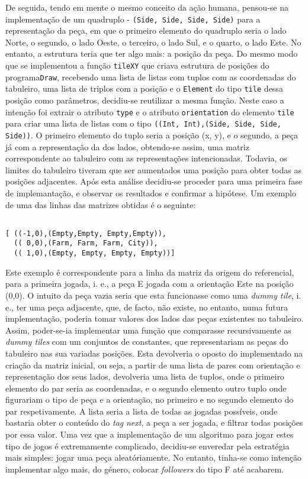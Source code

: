 De seguida, tendo em mente o mesmo conceito da ação humana, pensou-se na implementação de um quadruplo -
\texttt{(Side, Side, Side, Side)} para a representação da peça, em que o primeiro elemento do quadruplo
seria o lado Norte, o segundo, o lado Oeste, o terceiro, o lado Sul, e o quarto, o lado Este. No entanto, a
estrutura teria que ter algo mais: a posição da peça. Do mesmo modo que se implementou a função
\texttt{tileXY} que criava estrutura de posições do programa\texttt{Draw}, recebendo uma lista de listas com
tuplos com as coordenadas do tabuleiro, uma lista de triplos com a posição e o \texttt{Element} do tipo
\texttt{tile} dessa posição como parâmetros, decidiu-se reutilizar a mesma função. Neste caso a
intenção foi extrair o atributo \texttt{type} e o atributo \texttt{orientation} do elemento \texttt{tile}
para criar uma lista de listas com o tipo \texttt{((Int, Int),(Side, Side, Side, Side))}. O primeiro elemento
do tuplo seria a posição (x, y), e o segundo, a peça já com a representação da dos lados, obtendo-se
assim, uma matriz correspondente ao tabuleiro com as representações intencionadas. Todavia, os limites do
tabuleiro tiveram que ser aumentados uma posição para obter todas as posições adjacentes. Após esta
análise decidiu-se proceder para uma primeira fase de implemantação, e observar os resultados e confirmar a
hipótese. Um exemplo de uma das linhas das matrizes obtidas é o seguinte: 
\begin{verbatim} 

[ ((-1,0),(Empty,Empty, Empty,Empty)),
  (( 0,0),(Farm, Farm, Farm, City)), 
  (( 1,0),(Empty, Empty, Empty, Empty))] 

\end{verbatim}

Este exemplo é correspondente para a linha da matriz da origem do referencial, para a primeira jogada, i. e.,
a peça E jogada com a orientação Este na posição (0,0). O intuito da peça vazia seria que esta
funcionasse como uma \emph{dummy tile}, i. e., ter uma peça adjacente, que, de facto, não existe, no
entanto, numa futura implementação, poderia tomar valores dos lados das peças existentes no tabuleiro.
Assim, poder-se-ia implementar uma função que comparasse recursivamente as \emph{dummy tiles} com um
conjuntos de constantes, que representariam as peças do tabuleiro nas sua variadas posições. Esta
devolveria o oposto do implementado na criação da matriz inicial, ou seja, a partir de uma lista de pares
com orientação e representação dos seus lados, devolveria uma lista de tuplos, onde o primeiro elemento do
par seria as coordenadas, e o segundo elemento outro tuplo onde figurariam o tipo de peça e a orientação,
no primeiro e no segundo elemento do par respetivamente. A lista seria a lista de todas as jogadas possíveis,
onde bastaria obter o conteúdo do \emph{tag} \emph{next}, a peça a ser jogada, e filtrar todas posições
por essa valor. Uma vez que a implementação de um algoritmo para jogar estes tipo de jogos é extremamente
complicado, decidiu-se enveredar pela estratégia mais simples: jogar uma peça aleatóriamente. No entanto,
tinha-se como intenção implementar algo mais, do género, colocar \emph{followers} do tipo F até acabarem.


